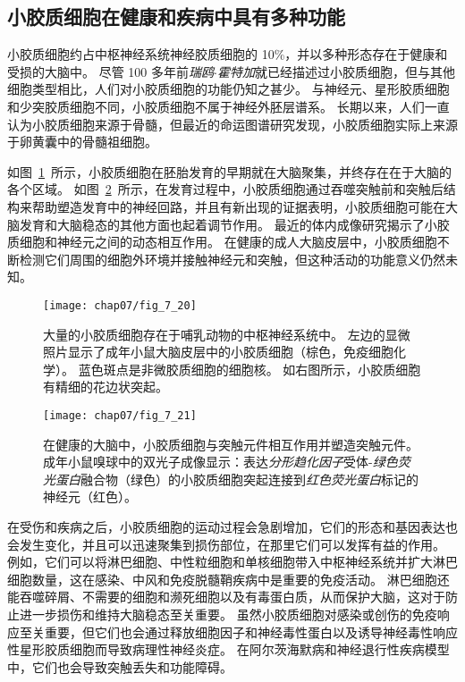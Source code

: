 \subsection{小胶质细胞在健康和疾病中具有多种功能}

小胶质细胞约占中枢神经系统神经胶质细胞的 10\%，并以多种形态存在于健康和受损的大脑中。
尽管 100 多年前\textit{瑞鸥$\cdot$霍特加}就已经描述过小胶质细胞，但与其他细胞类型相比，人们对小胶质细胞的功能仍知之甚少。
与神经元、星形胶质细胞和少突胶质细胞不同，小胶质细胞不属于神经外胚层谱系。
长期以来，人们一直认为小胶质细胞来源于骨髓，但最近的命运图谱研究发现，小胶质细胞实际上来源于卵黄囊中的骨髓祖细胞。


如图~\ref{fig:7_20}~所示，小胶质细胞在胚胎发育的早期就在大脑聚集，并终存在在于大脑的各个区域。
如图~\ref{fig:7_21}~所示，在发育过程中，小胶质细胞通过吞噬突触前和突触后结构来帮助塑造发育中的神经回路，并且有新出现的证据表明，小胶质细胞可能在大脑发育和大脑稳态的其他方面也起着调节作用。
最近的体内成像研究揭示了小胶质细胞和神经元之间的动态相互作用。
在健康的成人大脑皮层中，小胶质细胞不断检测它们周围的细胞外环境并接触神经元和突触，但这种活动的功能意义仍然未知。


\begin{figure}[htbp]
	\centering
	\texttt{[image: chap07/fig\_7\_20]}
	\caption{大量的小胶质细胞存在于哺乳动物的中枢神经系统中。
		左边的显微照片显示了成年小鼠大脑皮层中的小胶质细胞（棕色，免疫细胞化学）。
		蓝色斑点是非微胶质细胞的细胞核。
		如右图所示，小胶质细胞有精细的花边状突起。}
	\label{fig:7_20}
\end{figure}


\begin{figure}[htbp]
	\centering
	\texttt{[image: chap07/fig\_7\_21]}
	\caption{在健康的大脑中，小胶质细胞与突触元件相互作用并塑造突触元件。
		成年小鼠嗅球中的双光子成像显示：表达\textit{分形趋化因子}受体-\textit{绿色荧光蛋白}融合物（绿色）的小胶质细胞突起连接到\textit{红色荧光蛋白}标记的神经元（红色）。}
	\label{fig:7_21}
\end{figure}


在受伤和疾病之后，小胶质细胞的运动过程会急剧增加，它们的形态和基因表达也会发生变化，并且可以迅速聚集到损伤部位，在那里它们可以发挥有益的作用。
例如，它们可以将淋巴细胞、中性粒细胞和单核细胞带入中枢神经系统并扩大淋巴细胞数量，这在感染、中风和免疫脱髓鞘疾病中是重要的免疫活动。
淋巴细胞还能吞噬碎屑、不需要的细胞和濒死细胞以及有毒蛋白质，从而保护大脑，这对于防止进一步损伤和维持大脑稳态至关重要。
虽然小胶质细胞对感染或创伤的免疫响应至关重要，但它们也会通过释放细胞因子和神经毒性蛋白以及诱导神经毒性响应性星形胶质细胞而导致病理性神经炎症。
在阿尔茨海默病和神经退行性疾病模型中，它们也会导致突触丢失和功能障碍。


